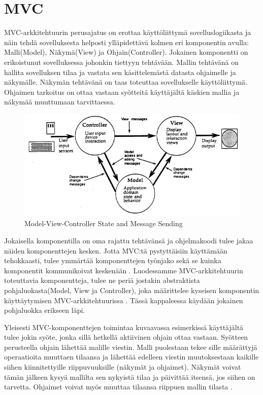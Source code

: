 \documentclass[finnish,utf8,nonumbib,palatino,kandi]{gradu2}
\begin{document}
\section {MVC}
MVC-arkkitehtuurin perusajatus on erottaa käyttöliittymä sovelluslogiikasta ja 
näin tehdä sovelluksesta helposti ylläpidettävä kolmen eri komponentin avulla: 
Malli(Model), Näkymä(View) ja Ohjain(Controller). Jokainen komponentti on 
erikoistunut sovelluksessa johonkin tiettyyn tehtävään. Mallin tehtävänä on 
hallita sovelluksen tilaa ja vastata sen käsittelemästä datasta ohjaimelle ja näkymälle.
Näkymän tehtävänä on taas toteuttaa sovellukselle käyttöliittymä. Ohjaimen tarkoitus on ottaa
vastaan syötteitä käyttäjältä käskien mallia ja näkymää muuttumaan tarvittaessa.

\begin{figure}[h]
\centering
\includegraphics[scale=0.85]{krasner_mvc.jpg}
\caption{Model-View-Controller State and Message Sending \cite[s. 5]{Krasner:desc}}
\end{figure}

Jokaisella komponentilla on oma rajattu tehtävänsä ja ohjelmakoodi tulee jakaa näiden komponenttejen kesken. Jotta MVC:tä pystyttäisiin käyttämään 
tehokkaasti, tulee ymmärtää komponenttejen työnjako sekä se kuinka komponentit kommunikoivat keskenään \cite{Burbeck}.  Luodessamme MVC-arkkitehtuurin
toteuttavia komponentteja, tulee ne periä jostakin abstraktista pohjaluokasta(Model, View ja Controller), joka määrittelee kyseisen komponentin käyttäytymisen MVC-arkkitehtuurissa  \cite[s. 5]{Krasner:desc}.  Tässä kappaleessa käydään jokainen pohjaluokka erikseen läpi. 

Yleisesti MVC-komponenttejen toimintaa kuvaavassa esimerkissä käyttäjältä tulee jokin syöte, jonka sillä hetkellä aktiivinen ohjain ottaa vastaan. Syötteen perusteella ohjain lähettää malille viestin. Malli puolestaan
tekee sille määrättyjä operaatioita muuttaen tilaansa ja lähettää edelleen viestin muutoksestaan kaikille siihen kiinnitettyille riippuvuuksille (näkymät ja ohjaimet). Näkymät
voivat tämän jälkeen kysyä mallilta sen nykyistä tilaa ja päivittää itsensä, jos siihen on tarvetta. Ohjaimet voivat myös muuttaa tilaansa riippuen mallin tilasta \cite[s. 4]{Krasner:desc}.
\end{document}
